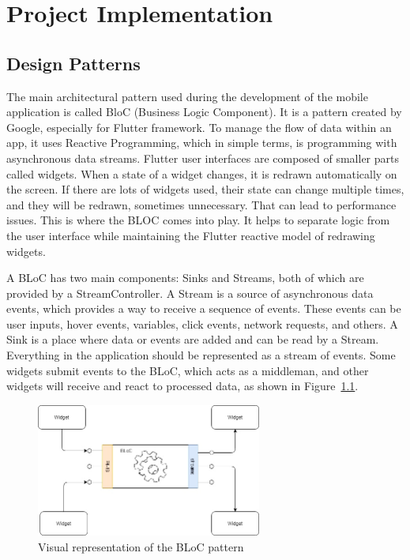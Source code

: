 \chapter{Project Implementation}
\section{Design Patterns}
The main architectural pattern used during the development of the mobile application is called BloC (Business Logic Component). It is a pattern created by Google, especially for Flutter framework. To manage the flow of data within an app, it uses Reactive Programming, which in simple terms, is programming with asynchronous data streams. Flutter user interfaces are composed of smaller parts called widgets. When a state of a widget changes, it is redrawn automatically on the screen. If there are lots of widgets used, their state can change multiple times, and they will be redrawn, sometimes unnecessary. That can lead to performance issues. This is where the BLOC comes into play. It helps to separate logic from the user interface while maintaining the Flutter reactive model of redrawing widgets.

A BLoC has two main components: Sinks and Streams, both of which are provided by a StreamController. A Stream is a source of asynchronous data events, which provides a way to receive a sequence of events. These events can be user inputs, hover events, variables, click events, network requests, and others. A Sink is a place where data or events are added and can be read by a Stream. Everything in the application should be represented as a stream of events. Some widgets submit events to the BLoC, which acts as a middleman, and other widgets will receive and react to processed data, as shown in Figure~\ref{fig:bloc-pattern}.

\begin{figure}[htb]
    \centering
    \includegraphics[width=0.66\textwidth]{fig04/bloc_pattern.png}
    \caption{Visual representation of the BLoC pattern} \label{fig:bloc-pattern}
\end{figure}

